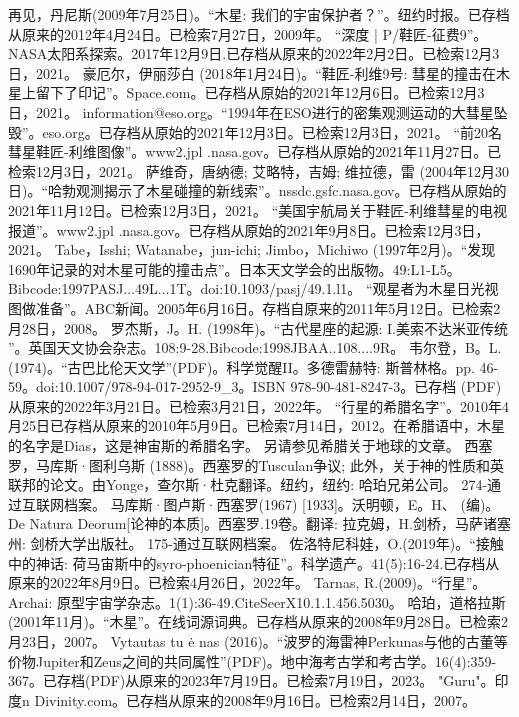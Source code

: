 \begin{enumerate}
 再见，丹尼斯(2009年7月25日)。“木星: 我们的宇宙保护者？”。纽约时报。已存档从原来的2012年4月24日。已检索7月27日，2009年。
 “深度 | P/鞋匠-征费9”。NASA太阳系探索。2017年12月9日.已存档从原来的2022年2月2日。已检索12月3日，2021。
 豪厄尔，伊丽莎白 (2018年1月24日)。“鞋匠-利维9号: 彗星的撞击在木星上留下了印记”。Space.com。已存档从原始的2021年12月6日。已检索12月3日，2021。
 information@eso.org。“1994年在ESO进行的密集观测运动的大彗星坠毁”。eso.org。已存档从原始的2021年12月3日。已检索12月3日，2021。
 “前20名彗星鞋匠-利维图像”。www2.jpl .nasa.gov。已存档从原始的2021年11月27日。已检索12月3日，2021。
 萨维奇，唐纳德; 艾略特，吉姆; 维拉德，雷 (2004年12月30日)。“哈勃观测揭示了木星碰撞的新线索”。nssdc.gsfc.nasa.gov。已存档从原始的2021年11月12日。已检索12月3日，2021。
 “美国宇航局关于鞋匠-利维彗星的电视报道”。www2.jpl .nasa.gov。已存档从原始的2021年9月8日。已检索12月3日，2021。
 Tabe，Isshi; Watanabe，jun-ichi; Jimbo，Michiwo (1997年2月)。“发现1690年记录的对木星可能的撞击点”。日本天文学会的出版物。49:L1-L5。Bibcode:1997PASJ...49L...1T。doi:10.1093/pasj/49.1.l1。
 “观星者为木星日光视图做准备”。ABC新闻。2005年6月16日。存档自原来的2011年5月12日。已检索2月28日，2008。
 罗杰斯，J。H. (1998年)。“古代星座的起源: I.美索不达米亚传统 ”。英国天文协会杂志。108:9-28.Bibcode:1998JBAA..108....9R。
 韦尔登，B。L.(1974)。“古巴比伦天文学”(PDF)。科学觉醒II。多德雷赫特: 斯普林格。pp. 46-59。doi:10.1007/978-94-017-2952-9_3。ISBN  978-90-481-8247-3。已存档 (PDF)从原来的2022年3月21日。已检索3月21日，2022年。
 “行星的希腊名字”。2010年4月25日已存档从原来的2010年5月9日。已检索7月14日，2012。在希腊语中，木星的名字是Dias，这是神宙斯的希腊名字。 另请参见希腊关于地球的文章。
 西塞罗，马库斯·图利乌斯 (1888)。西塞罗的Tusculan争议; 此外，关于神的性质和英联邦的论文。由Yonge，查尔斯·杜克翻译。纽约，纽约: 哈珀兄弟公司。 274-通过互联网档案。
 马库斯·图卢斯·西塞罗(1967) [1933]。沃明顿，E。H、 (编)。De Natura Deorum[论神的本质]。西塞罗.19卷。翻译: 拉克姆，H.剑桥，马萨诸塞州: 剑桥大学出版社。 175-通过互联网档案。
 佐洛特尼科娃，O.(2019年)。“接触中的神话: 荷马宙斯中的syro-phoenician特征”。科学遗产。41(5):16-24.已存档从原来的2022年8月9日。已检索4月26日，2022年。
 Tarnas, R.(2009)。“行星”。Archai: 原型宇宙学杂志。1(1):36-49.CiteSeerX10.1.1.456.5030。 
 哈珀，道格拉斯 (2001年11月)。“木星”。在线词源词典。已存档从原来的2008年9月28日。已检索2月23日，2007。
 Vytautas tu ė nas (2016)。“波罗的海雷神Perkunas与他的古董等价物Jupiter和Zeus之间的共同属性”(PDF)。地中海考古学和考古学。16(4):359-367。已存档(PDF)从原来的2023年7月19日。已检索7月19日，2023。
 "Guru"。印度n Divinity.com。已存档从原来的2008年9月16日。已检索2月14日，2007。

\end{enumerate}
